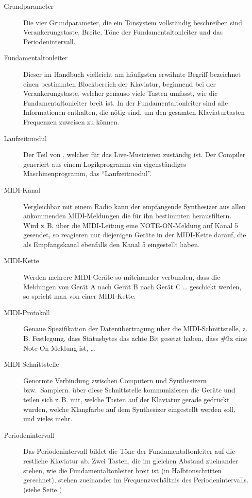 \begin{description}
\item[{Grundparameter}] Die vier Grundparameter, die ein Tonsystem
  vollständig beschreiben sind Verankerungstaste, Breite, Töne der
  Fundamentaltonleiter und das Periodenintervall.

\item[{Fundamentaltonleiter}] Dieser im Handbuch vielleicht am
  häufigsten erwähnte Begriff bezeichnet einen bestimmten Blockbereich
  der Klaviatur, beginnend bei der Verankerungstaste, welcher
  genauso viele Tasten umfasst, wie die Fundamentaltonleiter breit ist. In der
  Fundamentaltonleiter sind alle Informationen enthalten, die nötig
  sind, um den gesamten Klaviaturtasten Frequenzen zuweisen zu können.

\item[{Laufzeitmodul}] Der Teil von \mutabor{}, welcher für das
  Live-Musizieren zuständig ist. Der Compiler generiert aus einem
  Logikprogramm ein eigenständiges Maschinenprogramm, das
  "`Laufzeitmodul"'.

\item[{MIDI-Kanal}] Vergleichbar mit einem Radio kann der empfangende
  Synthesizer aus allen ankommenden MIDI-Meldungen die für ihn
  bestimmten herausfiltern. Wird z.\,B. über die MIDI-Leitung eine
  NOTE-ON-Meldung auf Kanal 5 gesendet, so reagieren nur diejenigen
  Geräte in der MIDI-Kette darauf, die als Empfangskanal ebenfalls den
  Kanal 5 eingestellt haben.

\item[{MIDI-Kette}] Werden mehrere MIDI-Geräte so miteinander
  verbunden, dass die Meldungen von Gerät A nach Gerät B nach Gerät C
  \dots{} geschickt werden, so spricht man von einer MIDI-Kette.

\item[{MIDI-Protokoll}] Genaue Spezifikation der Datenübertragung über
  die MIDI-Schnittstelle, z.\,B. Festlegung, dass Statusbytes das achte
  Bit gesetzt haben, dass \#9x eine Note-On-Meldung ist, \dots{}

\item[{MIDI-Schnittstelle}] Genormte Verbindung zwischen Computern und
  Synthesizern bzw.\ Samp\-lern. über diese Schnittstelle
  kommunizieren die Geräte und teilen sich z.\,B. mit, welche Tasten auf
  der Klaviatur gerade gedrückt wurden, welche Klangfarbe auf dem
  Synthesizer eingestellt werden soll, und vieles mehr.

\item[{Periodenintervall}] Das Periodenintervall bildet die Töne der
  Fundamentaltonleiter auf die restliche Klaviatur ab. Zwei Tasten,
  die im gleichen Abstand zueinander stehen, wie die
  Fundamentaltonleiter breit ist (in Halbtonschritten gerechnet),
  stehen zueinander im Frequenzverhältnis des Periodenintervalls.
  (siehe Seite \pageref{MATHE})


\end{description}
